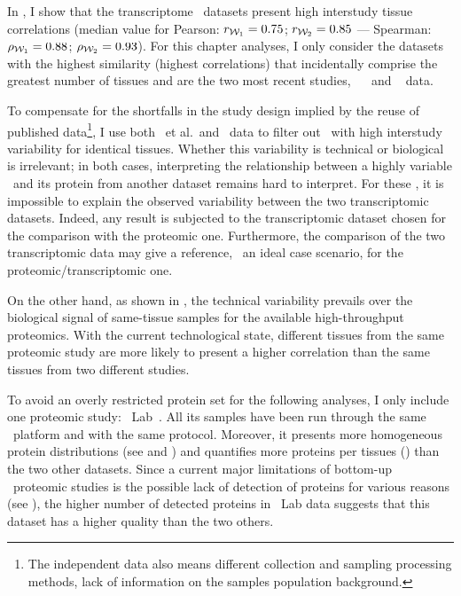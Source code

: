 In , I show that
the transcriptome \Rnaseq\ datasets present high interstudy tissue correlations
(median value for Pearson: $r_{\mathcal{W}_1}=0.75$; $r_{\mathcal{W}_2}=0.85$ ---
Spearman: $\rho_{\mathcal{W}_1}=0.88$; $\rho_{\mathcal{W}_2}=0.93$).
For this chapter analyses,
I only consider the datasets with the highest similarity
(highest correlations)
that incidentally comprise the greatest number of tissues
and are the two most recent studies,
\ie\ ~
and ~ data.\\
\vspace{-\baselineskip}

To compensate for the shortfalls in the study design implied
by the reuse of published data\footnote{%
The independent data also means
different collection and sampling processing methods,
lack of information on the samples population background.},
I use both \uhlen\ et al.\ and \gtex\ data
to filter out \mRNAs\ with high interstudy variability for identical tissues.
Whether this variability is technical or biological is irrelevant;
in both cases,
interpreting the relationship
between a highly variable \mRNAs\ and its protein from another dataset
remains hard to interpret.
For these \mRNAs,
it is impossible to explain the observed variability
between the two transcriptomic datasets.
Indeed, any result is subjected to the transcriptomic dataset chosen
for the comparison with the proteomic one.
Furthermore, the comparison of the two transcriptomic data may give a reference,
\ie\ an ideal case scenario, for the proteomic/transcriptomic one.

On the other hand,
as shown in ,
the technical variability prevails over
the biological signal of same-tissue samples
for the available high-throughput proteomics.
With the current technological state,
different tissues from the same proteomic study are more likely
to present a higher correlation
than the same tissues from two different studies.

To avoid an overly restricted protein set for the following analyses,
I only include one proteomic study: \pandey\ Lab~.
All its samples have been run through the same \ms\ platform and
with the same protocol.
Moreover, it presents more homogeneous protein distributions
(see  and ) and
quantifies more proteins per tissues ()
than the two other datasets.
Since a current major limitations of bottom-up \ms\ proteomic studies
is the possible lack of detection of proteins for various reasons
(see ),
the higher number of detected proteins in \pandey\ Lab data suggests that
this dataset has a higher quality than the two others.


